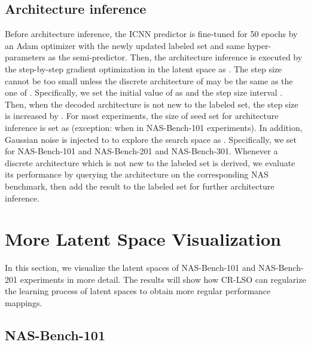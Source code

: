 \documentclass[10pt,twocolumn,letterpaper]{article}
\begin{document}
\subsection{Architecture inference} 
Before architecture inference, the ICNN predictor is fine-tuned for 50 epochs by an Adam optimizer with the newly updated labeled set and same hyper-parameters as the semi-predictor. Then, the architecture inference is executed by the step-by-step gradient optimization in the latent space as . The step size  cannot be too small unless the discrete architecture of  may be the same as the one of . Specifically, we set the initial value of  as  and the step size interval . Then, when the decoded architecture is not new to the labeled set, the step size is increased by . For most experiments, the size of seed set for architecture inference is set as  (exception:  when  in NAS-Bench-101 experiments). In addition, Gaussian noise is injected to  to explore the search space as . Specifically, we set  for NAS-Bench-101 and NAS-Bench-201 and NAS-Bench-301. Whenever a discrete architecture which is not new to the labeled set is derived, we evaluate its performance by querying the architecture on the corresponding NAS benchmark, then add the result to the labeled set for further architecture inference.  

\section{More Latent Space Visualization}
In this section, we visualize the latent spaces of NAS-Bench-101 and NAS-Bench-201 experiments in more detail. The results will show how CR-LSO can regularize the learning process of latent spaces to obtain more regular performance mappings.
\subsection{NAS-Bench-101}
\end{document}
